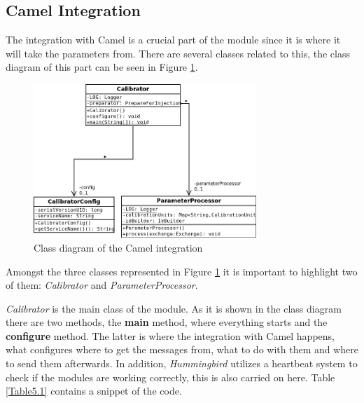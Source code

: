\subsection{Camel Integration}

The integration with Camel is a crucial part of the module since it is where it will take the parameters from. There are several classes related to this, the class diagram of this part can be seen in Figure \ref{f5.1}. 

\begin{figure}[H]
\centerline{\includegraphics[width=0.75\textwidth]{images/CalibratorCamelClassDiagram.png}}
\caption{Class diagram of the Camel integration}
\label{f5.1}
\end{figure}

Amongst the three classes represented in Figure \ref{f5.1} it is important to highlight two of them: \emph{Calibrator} and \emph{ParameterProcessor}.

\emph{Calibrator} is the main class of the module. As it is shown in the class diagram there are two methods, the \textbf{main} method, where everything starts and the \textbf{configure} method. The latter is where the integration with Camel happens, what configures where to get the messages from, what to do with them and where to send them afterwards. In addition, \emph{Hummingbird} utilizes a heartbeat system to check if the modules are working correctly, this is also carried on here. Table \ref{Table5.1} contains a snippet of the code.

